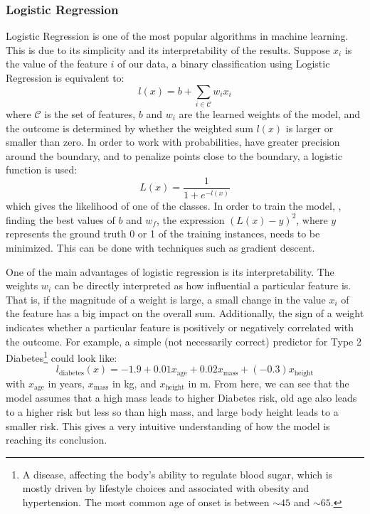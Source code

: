 \subsubsection{Logistic Regression}
Logistic Regression is one of the most popular algorithms in machine learning.
This is due to its simplicity and its interpretability of the results.
Suppose $x_i$ is the value of the feature $i$ of our data, a binary classification using Logistic Regression is equivalent to:
\[
l(x) = b + \sum_{i \in \mathcal{C}} w_i x_i
\]
where $\mathcal{C}$ is the set of features, $b$ and $w_i$ are the learned weights of the model, and the outcome is determined by whether the weighted sum $l(x)$ is larger or smaller than zero.
In order to work with probabilities, have greater precision around the boundary, and to penalize points close to the boundary, a logistic function is used:
\[
L(x) = \frac{1}{1 + e^{-l(x)}}
\]
which gives the likelihood of one of the classes.
In order to train the model, \ie, finding the best values of $b$ and $w_f$, the expression $(L(x) - y)^2$, where $y$ represents the ground truth 0 or 1 of the training instances, needs to be minimized.
This can be done with techniques such as gradient descent.

One of the main advantages of logistic regression is its interpretability.
The weights $w_i$ can be directly interpreted as how influential a particular feature is.
That is, if the magnitude of a weight is large, a small change in the value $x_i$ of the feature has a big impact on the overall sum.
Additionally, the sign of a weight indicates whether a particular feature is positively or negatively correlated with the outcome.
For example, a simple (not necessarily correct) predictor for Type 2 Diabetes\footnote{A disease, affecting the body's ability to regulate blood sugar, which is mostly driven by lifestyle choices and associated with obesity and hypertension. The most common age of onset is between ${\sim}45$ and ${\sim}65$.} could look like:
\[
l_\text{diabetes}(x) = -1.9 + 0.01 x_\text{age} + 0.02 x_\text{mass} + (-0.3) x_\text{height}
\]
with $x_\text{age}$ in years, $x_\text{mass}$ in kg, and $x_\text{height}$ in m.
From here, we can see that the model assumes that a high mass leads to higher Diabetes risk, old age also leads to a higher risk but less so than high mass, and large body height leads to a smaller risk.
This gives a very intuitive understanding of how the model is reaching its conclusion.

